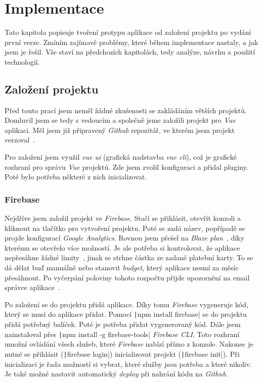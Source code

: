 
\chapter{Implementace}
Tato kapitola popisuje tvoření protypu aplikace od založení projektu po vydání první verze. Zmíním zajímavé problémy,
které během implementace nastaly, a jak jsem je řešil. Vše staví na předchozích kapitolách, tedy analýze, návrhu a použití
technologií.

\section{Založení projektu}
Před touto prací jsem neměl žádné zkušenosti se zakládáním větších projektů. Domluvil jsem se tedy s vedoucím a společně
jsme založili projekt pro \emph{Vue} aplikaci. Měl jsem již připravený \emph{Github} repozitář, ve kterém jsem projekt
verzoval~\cite{GithubAbout}.

Pro založení jsem využil \emph{vue ui} (grafická nadstavba \emph{vue cli}), což je grafické rozhraní pro správu \emph{Vue} projektů.
Zde jsem zvolil konfiguraci a přidal pluginy. Poté bylo potřeba některé z nich inicializovat.

\subsection{Firebase}
Nejdříve jsem založil projekt ve \emph{Firebase}. Stačí se přihlásit, otevřít konzoli a kliknout na tlačítko pro vytvoření projektu.
Poté se zadá název, popřípadě se projde konfigurací \emph{Google Analytics}. Rovnou jsem přešel na \emph{Blaze plan}~\cite{FirebasePricing}, díky kterému
se otevřelo více možností. Je ale potřeba si kontrolovat, že aplikace nepřesáhne žádné limity~\cite{FirebaseLimits}, jinak se strhne
částka ze zadané platební karty. To se dá dělat buď manuálně nebo stanovit \emph{budget}, který aplikace nesmí za měsíc přesáhnout.
Po vyčerpání poloviny tohoto rozpočtu přijde upozornění na email správce aplikace~\cite{FirebaseBudget}.

Po založení se do projektu přidá aplikace. Díky tomu \emph{Firebase} vygeneruje kód, který se musí do aplikace přidat.
Pomocí \texttt|npm install firebase| se do projektu přidá potřebný balíček. Poté je potřeba přidat vygenerovaný
kód. Dále jsem nainstaloval přes \texttt|npm install -g firebase-tools| \emph{Firebase CLI}. Toto rozhraní umožní
ovládání všech služeb, které \emph{Firebase} nabízí přímo z konzole. Nakonec je nutné se přihlásit (\texttt|firebase login|)
inicializovat projekt (\texttt|firebase init|). Při inicializaci je řada možností si vybrat, které služby jsou potřeba
a které nikoliv. Je také možné nastavit automatický \emph{deploy} při nahrání kódu na \emph{Github}.


